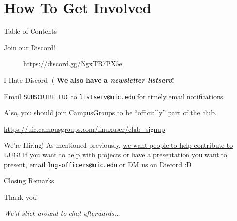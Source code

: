 \documentclass{beamer}
\begin{document}
\section{How To Get Involved}
\begin{frame}{Table of Contents}
	\tableofcontents[currentsection]
\end{frame}

\begin{frame}{Join our Discord!}
	\begin{figure}
		\centering
		
		\caption{\url{https://discord.gg/NgxTR7PX5e}}
	\end{figure}
\end{frame}

\begin{frame}{I Hate Discord \>:(}
	\textbf{We also have a \textit{newsletter listserv}!}

	Email \texttt{SUBSCRIBE LUG} to
	\href{mailto:listserv@uic.edu}{\texttt{listserv@uic.edu}} for timely
	email notifications.

	Also, you should join CampusGroups to be ``officially'' part of the club.

	\url{https://uic.campusgroups.com/linuxuser/club\_signup}
\end{frame}

\begin{frame}{We're Hiring!}
	As mentioned previously, \underline{we want people to help contribute
	to LUG!} \pause If you want to help with projects or have a
	presentation you want to present, email
	\href{mailto:lug-officers@uic.edu}{\texttt{lug-officers@uic.edu}} or DM
	us on Discord :D
\end{frame}

\begin{frame}{Closing Remarks}
	\begin{center}
		{\Huge Thank you!}

		\textit{We'll stick around to chat afterwards...}
	\end{center}
\end{frame}
\end{document}
